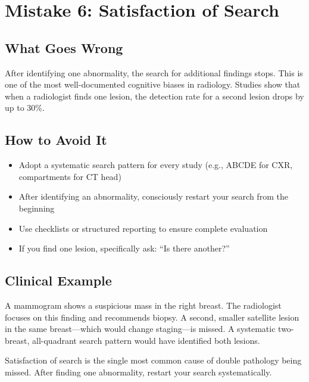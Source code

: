 \clearpage

\section{Mistake 6: Satisfaction of Search}

\subsection{What Goes Wrong}
After identifying one abnormality, the search for additional findings stops. This is one of the most well-documented cognitive biases in radiology. Studies show that when a radiologist finds one lesion, the detection rate for a second lesion drops by up to 30\%.

\subsection{How to Avoid It}
\begin{itemize}
    \item Adopt a systematic search pattern for every study (e.g., ABCDE for CXR, compartments for CT head)
    \item After identifying an abnormality, consciously restart your search from the beginning
    \item Use checklists or structured reporting to ensure complete evaluation
    \item If you find one lesion, specifically ask: ``Is there another?''
\end{itemize}

\subsection{Clinical Example}
A mammogram shows a suspicious mass in the right breast. The radiologist focuses on this finding and recommends biopsy. A second, smaller satellite lesion in the same breast---which would change staging---is missed. A systematic two-breast, all-quadrant search pattern would have identified both lesions.

\begin{pearlbox}
Satisfaction of search is the single most common cause of double pathology being missed. After finding one abnormality, restart your search systematically.
\end{pearlbox}

